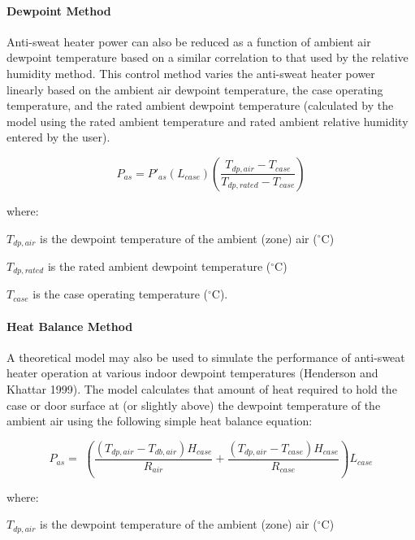 \paragraph{Dewpoint Method}\label{dewpoint-method}

Anti-sweat heater power can also be reduced as a function of ambient air dewpoint temperature based on a similar correlation to that used by the relative humidity method. This control method varies the anti-sweat heater power linearly based on the ambient air dewpoint temperature, the case operating temperature, and the rated ambient dewpoint temperature (calculated by the model using the rated ambient temperature and rated ambient relative humidity entered by the user).

\begin{equation}
{P_{as}} = {P'}_{as}\left( {{L_{case}}} \right)\left( {\frac{{{T_{dp,air}} - {T_{case}}}}{{{T_{dp,rated}} - {T_{case}}}}} \right)
\end{equation}

where:

\({T_{dp,air}}\) is the dewpoint temperature of the ambient (zone) air (\(^{\circ}\)C)

\({T_{dp,rated}}\) is the rated ambient dewpoint temperature (\(^{\circ}\)C)

\({T_{case}}\) is the case operating temperature (\(^{\circ}\)C).

\paragraph{Heat Balance Method}\label{heat-balance-method}

A theoretical model may also be used to simulate the performance of anti-sweat heater operation at various indoor dewpoint temperatures (Henderson and Khattar 1999). The model calculates that amount of heat required to hold the case or door surface at (or slightly above) the dewpoint temperature of the ambient air using the following simple heat balance equation:

\begin{equation}
{P_{as}} = \,\,\left( {\frac{{\left( {{T_{dp,air}} - {T_{db,air}}} \right){H_{case}}}}{{{R_{air}}}} + \frac{{\left( {{T_{dp,air}} - {T_{case}}} \right){H_{case}}}}{{{R_{case}}}}} \right){L_{case}}
\end{equation}

where:

\({T_{dp,air}}\) is the dewpoint temperature of the ambient (zone) air (\(^{\circ}\)C)


